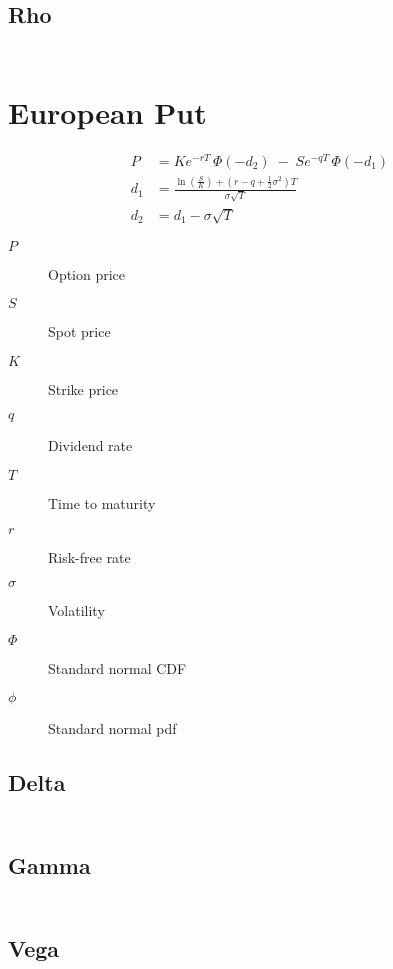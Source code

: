 \documentclass[12pt,a4paper]{article}
\begin{document}
\subsection{Rho}

\[
  \begin{aligned}
  \end{aligned}
\]

\section{European Put}

\[
  \begin{aligned}
    P   & = K e^{-rT}\,\Phi(-d_2) \;-\; S e^{-qT}\,\Phi(-d_1) \\
    d_1 & = \frac{\ln\!\left(\tfrac{S}{K}\right) + (r - q + \tfrac{1}{2}\sigma^2)T}{\sigma \sqrt{T}} \\
    d_2 & = d_1 - \sigma \sqrt{T}
  \end{aligned}
\]

\begin{description}
  \item[$P$] Option price
  \item[$S$] Spot price
  \item[$K$] Strike price
  \item[$q$] Dividend rate
  \item[$T$] Time to maturity
  \item[$r$] Risk-free rate
  \item[$\sigma$] Volatility
  \item[$\Phi$] Standard normal CDF
  \item[$\phi$] Standard normal pdf
\end{description}

\subsection{Delta}
\[
  \begin{aligned}
  \end{aligned}
\]

\subsection{Gamma}
\[
  \begin{aligned}
  \end{aligned}
\]

\subsection{Vega}
\[
  \begin{aligned}
  \end{aligned}
\]
\end{document}

